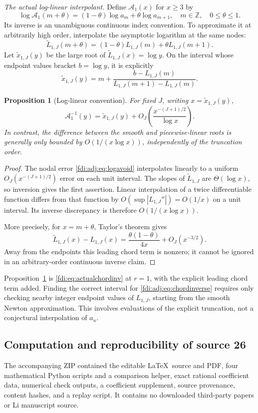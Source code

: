 \documentclass[11pt,letterpaper]{article}
\newtheorem{proposition}[theorem]{Proposition}
\theoremstyle{remark}\newtheorem{remark}[theorem]{Remark}
\begin{document}
\emph{The actual log-linear interpolant.} Define $\mathcal A_1(x)$ for $x\ge3$ by
\[
 \log\mathcal A_1(m+\theta)=(1-\theta)\log a_m+\theta\log a_{m+1},
 \quad m\in\mathbb Z,\quad0\le\theta\le1.
\]
Its inverse is an unambiguous continuous index convention. To approximate it at arbitrarily high order, interpolate the asymptotic logarithm at the same nodes:
\[
 \widetilde L_{1,J}(m+\theta)=(1-\theta)L_{1,J}(m)+\theta L_{1,J}(m+1).
\]
Let $\widetilde x_{1,J}(y)$ be the large root of $\widetilde L_{1,J}(x)=\log y$. On the interval whose endpoint values bracket $b=\log y$, it is explicitly
\begin{equation}\label{fdi:adj:eq:chordinverse}
 \widetilde x_{1,J}(y)=m+\frac{b-L_{1,J}(m)}{L_{1,J}(m+1)-L_{1,J}(m)}.
\end{equation}
\begin{proposition}[Log-linear convention]\label{fdi:adj:prop:loglinear}
For fixed $J$, writing $x=\widetilde x_{1,J}(y)$,
\[
 \mathcal A_1^{-1}(y)=\widetilde x_{1,J}(y)
       +O_J\left(\frac{x^{-(J+1)/2}}{\log x}\right).
\]
In contrast, the difference between the smooth and piecewise-linear roots is generally only bounded by $O(1/(x\log x))$, independently of the truncation order.
\end{proposition}
\begin{proof}
The nodal error \eqref{fdi:adj:eq:logavoid} interpolates linearly to a uniform $O_J(x^{-(J+1)/2})$ error on each unit interval. The slopes of $\widetilde L_{1,J}$ are $\Theta(\log x)$, so inversion gives the first assertion. Linear interpolation of a twice differentiable function differs from that function by $O(\sup|L_{1,J}''|)=O(1/x)$ on a unit interval. Its inverse discrepancy is therefore $O(1/(x\log x))$.

More precisely, for $x=m+\theta$, Taylor's theorem gives
\[
 \widetilde L_{1,J}(x)-L_{1,J}(x)
  =\frac{\theta(1-\theta)}{4x}+O_J(x^{-3/2}).
\]
Away from the endpoints this leading chord term is nonzero; it cannot be ignored in an arbitrary-order continuous inverse claim.
\end{proof}
Proposition~\ref{fdi:adj:prop:loglinear} is \eqref{fdi:eq:actualchordinv} at $r=1$, with the explicit leading chord term added. Finding the correct interval for \eqref{fdi:adj:eq:chordinverse} requires only checking nearby integer endpoint values of $L_{1,J}$, starting from the smooth Newton approximation. This involves evaluations of the explicit truncation, not a conjectural interpolation of $a_n$.

\subsection{Computation and reproducibility of source 26}\label{fdi:adj:sec:repro}
The accompanying ZIP contained the editable \LaTeX\ source and PDF, four mathematical Python scripts and a comparison helper, exact rational coefficient data, numerical check outputs, a coefficient supplement, source provenance, content hashes, and a replay script. It contains no downloaded third-party papers or Li manuscript source.
\end{document}
